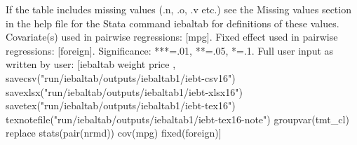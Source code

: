 If the table includes missing values (.n, .o, .v etc.) see the Missing values section in the help file for the Stata command iebaltab for definitions of these values. Covariate(s) used in pairwise regressions: [mpg]. Fixed effect used in pairwise regressions: [foreign]. Significance: ***=.01, **=.05, *=.1. Full user input as written by user: [iebaltab weight price , savecsv("run/iebaltab/outputs/iebaltab1/iebt-csv16") savexlsx("run/iebaltab/outputs/iebaltab1/iebt-xlsx16") savetex("run/iebaltab/outputs/iebaltab1/iebt-tex16") texnotefile("run/iebaltab/outputs/iebaltab1/iebt-tex16-note") groupvar(tmt\_cl) replace stats(pair(nrmd)) cov(mpg) fixed(foreign)] 
